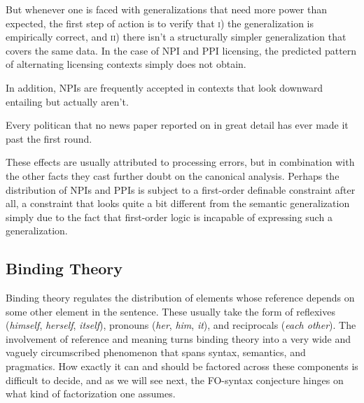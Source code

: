 But whenever one is faced with generalizations that need more power than expected, the first step of action is to verify that \textsc{i}) the generalization is empirically correct, and \textsc{ii}) there isn't a structurally simpler generalization that covers the same data.
In the case of NPI and PPI licensing, the predicted pattern of alternating licensing contexts simply does not obtain.
%
\begin{exe}
    \ex
    \begin{xlist}
    \end{xlist}
\end{exe}
%
In addition, NPIs are frequently accepted in contexts that look downward entailing but actually aren't.
%
\begin{exe}
    \ex Every politican that no news paper reported on in great detail has ever made it past the first round.
\end{exe}
%
These effects are usually attributed to processing errors, but in combination with the other facts they cast further doubt on the canonical analysis.
Perhaps the distribution of NPIs and PPIs is subject to a first-order definable constraint after all, a constraint that looks quite a bit different from the semantic generalization simply due to the fact that first-order logic is incapable of expressing such a generalization.

\subsection{Binding Theory}

Binding theory regulates the distribution of elements whose reference depends on some other element in the sentence.
These usually take the form of reflexives (\emph{himself}, \emph{herself}, \emph{itself}), pronouns (\emph{her}, \emph{him}, \emph{it}), and reciprocals (\emph{each other}).
The involvement of reference and meaning turns binding theory into a very wide and vaguely circumscribed phenomenon that spans syntax, semantics, and pragmatics.
How exactly it can and should be factored across these components is difficult to decide, and as we will see next, the FO-syntax conjecture hinges on what kind of factorization one assumes.

